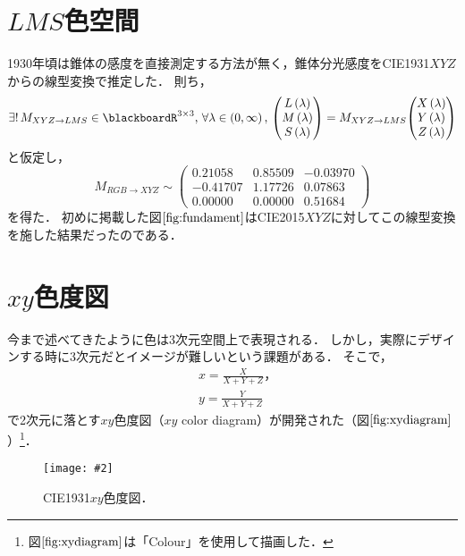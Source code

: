 \documentclass[uplatex,paper=a4,fontsize=4.0truemm,jafontsize=4.0truemm,head_space=30.0truemm,foot_space=30.0truemm,baselineskip=8.0truemm,line_length=40zw,gutter=25.0truemm,oneside,openany,fleqn,hanging_panctuation,open_bracket_pos=nibu_tentsuki,dvipdfmx,jis2004,book,titlepage]{jlreq}
\theoremstyle{mystyle}
\newcommand{\captiondot}[1]{\caption{#1．}}
\newcommand{\figureinput}[4]{\begin{figure}[tbp]\centering\texttt{[image: \#2]}\captiondot{#3}\label{fig:#4}\end{figure}}
\newcommand{\mathdisplaystyle}[1]{\(\displaystyle{#1}\)}
\newcommand{\Reference}[1]{\mathdisplaystyle{\ref{#1}}}
\newcommand{\negativevalue}[1]{{-#1}}
\newcommand{\fraction}[2]{\displaystyle{\frac{\displaystyle{#1}}{\displaystyle{#2}}}}
\newcommand{\mathcomma}{\mathpunct{,\,}}
\newcommand{\parentheses}[1]{\left(#1\right)}
\newcommand{\easymatrix}[1]{\mathord{\begin{pmatrix}#1\end{pmatrix}}}
\begin{document}
		\section{\mathdisplaystyle{LMS}色空間}
			1930年頃は錐体の感度を直接測定する方法が無く，錐体分光感度をCIE1931\mathdisplaystyle{XYZ}からの線型変換で推定した．
			則ち，
			\begin{equation*}
				\exists!\,{M_{XYZ\to LMS}\in\blackboardR^{3\times3}}\mathcomma\forall\lambda\in\parentheses{0,\infty}\mathcomma\easymatrix{L\parentheses{\lambda} \\ M\parentheses{\lambda} \\ S\parentheses{\lambda}}=M_{XYZ\to LMS}\easymatrix{X\parentheses{\lambda} \\ Y\parentheses{\lambda} \\ Z\parentheses{\lambda}}
			\end{equation*}
			と仮定し，
			\begin{equation*}
				M_{RGB\to XYZ}\sim\easymatrix{0.21058 & 0.85509 & \negativevalue{0.03970} \\ \negativevalue{0.41707} & 1.17726 & 0.07863 \\ 0.00000 & 0.00000 & 0.51684}
			\end{equation*}
			を得た．
			初めに掲載した図\Reference{fig:fundament}はCIE2015\mathdisplaystyle{XYZ}に対してこの線型変換を施した結果だったのである．
		\section{\mathdisplaystyle{xy}色度図}
			今まで述べてきたように色は3次元空間上で表現される．
			しかし，実際にデザインする時に3次元だとイメージが難しいという課題がある．
			そこで，\begin{align*}
				&x=\fraction{X}{X+Y+Z}\textrm{，}\\
				&y=\fraction{Y}{X+Y+Z}
			\end{align*}
			で2次元に落とす\mathdisplaystyle{xy}色度図（\mathdisplaystyle{xy} color diagram）が開発された（図\Reference{fig:xydiagram}）\footnote{図\Reference{fig:xydiagram}は「Colour」を使用して描画した．}．
			\figureinput{width=\linewidth}{D:/a/figs/xy.png}{CIE1931\mathdisplaystyle{xy}色度図}{xydiagram}
\end{document}
